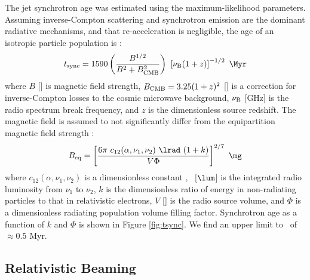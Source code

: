 \documentclass[11pt, preprint]{aastex}
\begin{document}
The jet synchrotron age was estimated using the maximum-likelihood
parameters. Assuming inverse-Compton scattering and synchrotron
emission are the dominant radiative mechanisms, and that
re-acceleration is negligible, the age of an isotropic particle
population is \citep{2001AJ....122.1172S}:
\begin{equation}
  \tsync = 1590 \left(\frac{B^{1/2}}{B^2 + B_{\rm{CMB}}^2}\right)~
  \left[\nu_{\rm{B}} (1+z)\right]^{-1/2} ~\Myr
\end{equation}
where $B$ [\mg] is magnetic field strength, $B_{\rm{CMB}} =
3.25(1+z)^2$ [\mg] is a correction for inverse-Compton losses to the
cosmic microwave background, $\nu_{\rm{B}}$ [GHz] is the radio
spectrum break frequency, and $z$ is the dimensionless source
redshift. The magnetic field is assumed to not significantly differ
from the equipartition magnetic field strength
\citep{1980ARA&A..18..165M}:
\begin{equation}
  B_{\rm{eq}} = \left[\frac{6 \pi ~c_{12}(\alpha,\nu_1, \nu_2)
      ~\lrad ~(1+k)}{V \Phi}\right]^{2/7} ~\rm{\mg}
\end{equation}
where $c_{12}(\alpha,\nu_1,\nu_2)$ is a dimensionless constant
\citep{pach}, \lrad\ [$\lum$] is the integrated radio luminosity from
$\nu_1$ to $\nu_2$, $k$ is the dimensionless ratio of energy in
non-radiating particles to that in relativistic electrons, $V$ [\cc]
is the radio source volume, and $\Phi$ is a dimensionless radiating
population volume filling factor. Synchrotron age as a function of $k$
and $\Phi$ is shown in Figure \ref{fig:tsync}. We find an upper limit
to \tsync\ of $\approx 0.5$ Myr.

\subsection{Relativistic Beaming}
\label{sec:beam}
\end{document}
